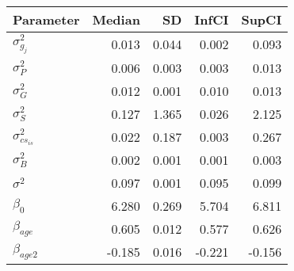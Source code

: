 \begin{table}[ht]
\centering
\begin{tabular}{lrrrr}
  \hline
Parameter & Median & SD & InfCI & SupCI \\ 
  \hline
$\sigma^{2}_{g_{j}}$ & 0.013 & 0.044 & 0.002 & 0.093 \\ 
  $\sigma^{2}_{P}$ & 0.006 & 0.003 & 0.003 & 0.013 \\ 
  $\sigma^{2}_{G}$ & 0.012 & 0.001 & 0.010 & 0.013 \\ 
  $\sigma^{2}_{S}$ & 0.127 & 1.365 & 0.026 & 2.125 \\ 
  $\sigma^{2}_{cs_{is}}$ & 0.022 & 0.187 & 0.003 & 0.267 \\ 
  $\sigma^{2}_{B}$ & 0.002 & 0.001 & 0.001 & 0.003 \\ 
  $\sigma^{2}$ & 0.097 & 0.001 & 0.095 & 0.099 \\ 
  $\beta_{0}$ & 6.280 & 0.269 & 5.704 & 6.811 \\ 
  $\beta_{age}$ & 0.605 & 0.012 & 0.577 & 0.626 \\ 
  $\beta_{age2}$ & -0.185 & 0.016 & -0.221 & -0.156 \\ 
   \hline
\end{tabular}
\end{table}
